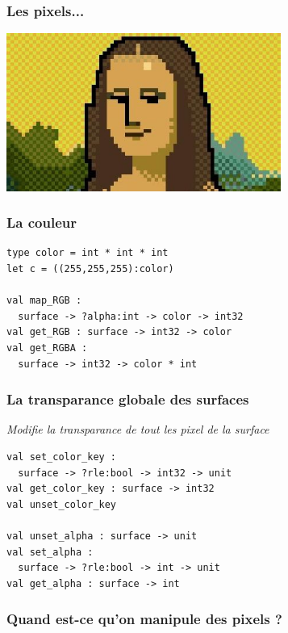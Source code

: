 \begin{frame}
	\frametitle{Les pixels...}
	\begin{center}
		\includegraphics[width=9cm]{pics/Joconde-pixel.jpg}
	\end{center}
\end{frame}

\begin{frame}[fragile]
	\frametitle{La couleur}
	\begin{lstlisting}
type color = int * int * int
let c = ((255,255,255):color)

val map_RGB : 
  surface -> ?alpha:int -> color -> int32
val get_RGB : surface -> int32 -> color
val get_RGBA : 
  surface -> int32 -> color * int
	\end{lstlisting}
\end{frame}

\begin{frame}[fragile]
	\frametitle{La transparance \textbf{globale} des surfaces}
	\textit{Modifie la transparance de tout les pixel de la surface}
	\begin{lstlisting}
val set_color_key : 
  surface -> ?rle:bool -> int32 -> unit
val get_color_key : surface -> int32
val unset_color_key

val unset_alpha : surface -> unit
val set_alpha : 
  surface -> ?rle:bool -> int -> unit
val get_alpha : surface -> int
	\end{lstlisting}
\end{frame}

\begin{frame}[fragile]
	\frametitle{\og{}Quand est-ce qu'on manipule des pixels ?\fg}

\end{frame}
